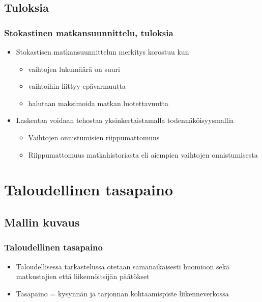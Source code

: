 \documentclass{beamer}
\newcommand*{\secpage}{\usebeamertemplate*{section pages}}
\begin{document}
    \subsection{Tuloksia}
        \begin{frame}
  \frametitle{Stokastinen matkansuunnittelu, tuloksia} 
  \begin{itemize}
   \item 
Stokastisen matkansuunnittelun merkitys korostuu kun 
\begin{itemize}
 \item 
vaihtojen lukumäärä on suuri 
\item
vaihtoihin liittyy epävarmuutta
\item
halutaan maksimoida matkan luotettavuutta
\end{itemize}
\item
Laskentaa voidaan tehostaa yksinkertaistamalla todennäköisyysmallia
\begin{itemize}
 \item 
Vaihtojen onnistumisien riippumattomuus
\item
Riippumattomuus matkahistoriasta eli aiempien vaihtojen onnistumisesta
\end{itemize}
\end{itemize}
    \end{frame}     
    
    
\section{Taloudellinen tasapaino}
\frame{\secpage}
\subsection{Mallin kuvaus}
\begin{frame}
  \frametitle{Taloudellinen tasapaino} 
  \begin{itemize}
   \item 
   Taloudellisessa tarkastelussa otetaan samanaikaisesti huomioon sekä matkustajien että liikennöitsijän päätökset
   \item
   Tasapaino = kysynnän ja tarjonnan kohtaamispiste liikenneverkossa
   \end{itemize}
    \end{frame}   
    
\end{document}
